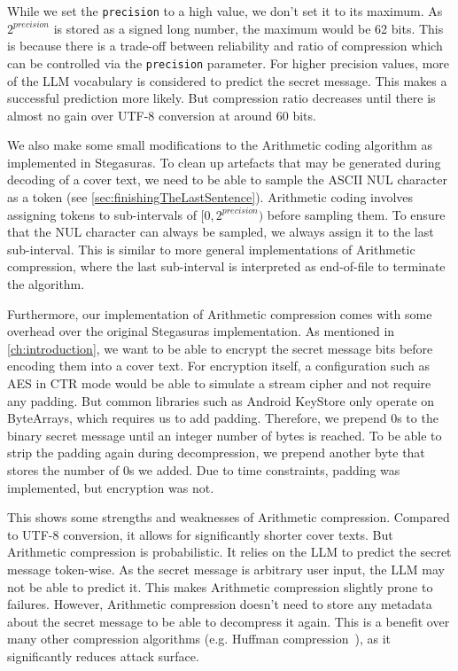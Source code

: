 While we set the \lstinline|precision| to a high value, we don't set it to its maximum. As $2^{precision}$ is stored as a signed long number, the maximum would be 62 bits. This is because there is a trade-off between reliability and ratio of compression which can be controlled via the \lstinline|precision| parameter. For higher precision values, more of the \gls{LLM} vocabulary is considered to predict the secret message. This makes a successful prediction more likely. But compression ratio decreases until there is almost no gain over UTF-8 conversion at around 60 bits.

We also make some small modifications to the Arithmetic coding algorithm as implemented in Stegasuras. To clean up artefacts that may be generated during decoding of a cover text, we need to be able to sample the ASCII NUL character as a token (see \cref{sec:finishingTheLastSentence}). Arithmetic coding involves assigning tokens to sub-intervals of $ [0, 2^{precision}) $ before sampling them. To ensure that the NUL character can always be sampled, we always assign it to the last sub-interval. This is similar to more general implementations of Arithmetic compression, where the last sub-interval is interpreted as end-of-file to terminate the algorithm.

Furthermore, our implementation of Arithmetic compression comes with some overhead over the original Stegasuras implementation. As mentioned in \cref{ch:introduction}, we want to be able to encrypt the secret message bits before encoding them into a cover text. For encryption itself, a configuration such as \gls{AES} in \gls{CTR} mode would be able to simulate a stream cipher and not require any padding. But common libraries such as Android KeyStore only operate on ByteArrays, which requires us to add padding. Therefore, we prepend 0s to the binary secret message until an integer number of bytes is reached. To be able to strip the padding again during decompression, we prepend another byte that stores the number of 0s we added. Due to time constraints, padding was implemented, but encryption was not.

This shows some strengths and weaknesses of Arithmetic compression. Compared to UTF-8 conversion, it allows for significantly shorter cover texts. But Arithmetic compression is probabilistic. It relies on the \gls{LLM} to predict the secret message token-wise. As the secret message is arbitrary user input, the \gls{LLM} may not be able to predict it. This makes Arithmetic compression slightly prone to failures. However, Arithmetic compression doesn't need to store any metadata about the secret message to be able to decompress it again. This is a benefit over many other compression algorithms (e.g. Huffman compression~\cite{huffmanMethodConstructionMinimumRedundancy1952}), as it significantly reduces attack surface.

